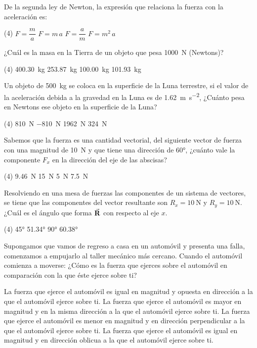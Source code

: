 \documentclass[12pt, letter]{exam}
\begin{document}
\begin{questions}
    \question De la segunda ley de Newton, la expresión que relaciona la fuerza con la aceleración es:
    \begin{tasks}(4)
        \task $F = \dfrac{m}{a}$
        \task $F = m \, a$
        \task $F = \dfrac{a}{m}$
        \task $F = m^{2} \, a$
    \end{tasks}
    \question ¿Cuál es la masa en la Tierra de un objeto que pesa \SI{1000}{\newton} (Newtons)?
    \begin{tasks}(4)
        \task \SI{400.30}{\kilo\gram}
        \task \SI{253.87}{\kilo\gram}
        \task \SI{100.00}{\kilo\gram}
        \task \SI{101.93}{\kilo\gram}
    \end{tasks}
    \question Un objeto de \SI{500}{\kilo\gram} se coloca en la superficie de la Luna terrestre, si el valor de la aceleración debida a la gravedad en la Luna es de \SI{1.62}{\meter\per\square\second}, ¿Cuánto pesa en Newtons ese objeto en la superficie de la Luna?
    \begin{tasks}(4)
        \task \SI{810}{\newton}
        \task \SI{-810}{\newton}
        \task \SI{1962}{\newton}
        \task \SI{324}{\newton}
    \end{tasks}
    \question Sabemos que la fuerza es una cantidad vectorial, del siguiente vector de fuerza con una magnitud de \SI{10}{\newton} y que tiene una dirección de \ang{60}, ¿cuánto vale la componente $F_{x}$ en la dirección del eje de las abscisas?
    \begin{tasks}(4)
        \task \SI{9.46}{\newton}
        \task \SI{15}{\newton}
        \task \SI{5}{\newton}
        \task \SI{7.5}{\newton}
    \end{tasks}
    \question Resolviendo en una mesa de fuerzas las componentes de un sistema de vectores, se tiene que las componentes del vector resultante son $R_{x} = \SI{10}{\newton}$ y $R_{y} = \SI{10}{\newton}$. ¿Cuál es el ángulo que forma $\va{R}$ con respecto al eje $x$.
    \begin{tasks}(4)
        \task \ang{45}
        \task \ang{51.34}
        \task \ang{90}
        \task \ang{60.38}
    \end{tasks}
    \question Supongamos que vamos de regreso a casa en un automóvil y presenta una falla, comenzamos a empujarlo al taller mecánico más cercano. Cuando el automóvil comienza a moverse: ¿Cómo es la fuerza que ejerces sobre el automóvil en comparación con la que éste ejerce sobre ti? 
    \begin{tasks}
        \task La fuerza que ejerce el automóvil es igual en magnitud y opuesta en dirección a la que el automóvil ejerce sobre ti.
        \task La fuerza que ejerce el automóvil es mayor en magnitud y en la misma dirección a la que el automóvil ejerce sobre ti.
        \task La fuerza que ejerce el automóvil es menor en magnitud y en dirección perpendicular a la que el automóvil ejerce sobre ti.
        \task La fuerza que ejerce el automóvil es igual en magnitud y en dirección oblicua a la que el automóvil ejerce sobre ti.
    \end{tasks}


\end{questions}
\end{document}
